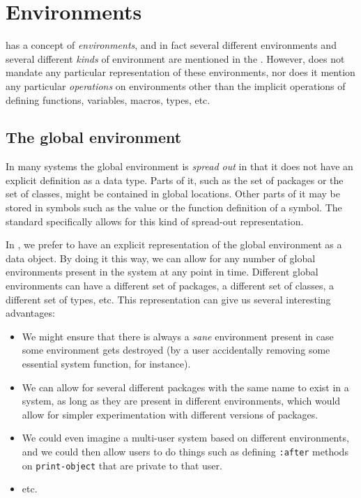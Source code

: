 \chapter{Environments}
\label{chap-environments}

\commonlisp{} has a concept of \emph{environments}, and in fact several
different environments and several different \emph{kinds} of
environment are mentioned in the \hs{}.  However, \commonlisp{} does not
mandate any particular representation of these environments, nor does
it mention any particular \emph{operations} on environments other than
the implicit operations of defining functions, variables, macros,
types, etc. 

\section{The global environment}
\label{sec-the-global-environment}

In many \commonlisp{} systems the global environment is \emph{spread
  out} in that it does not have an explicit definition as a data type.
Parts of it, such as the set of packages or the set of classes, might
be contained in global locations.  Other parts of it may be stored in
symbols such as the value or the function definition of a symbol.  The
standard specifically allows for this kind of spread-out
representation.

In \sysname{}, we prefer to have an explicit representation of the
global environment as a data object.  By doing it this way, we can
allow for any number of global environments present in the system at
any point in time.  Different global environments can have a different
set of packages, a different set of classes, a different set of types,
etc.  This representation can give us several interesting advantages: 

\begin{itemize}
\item We might ensure that there is always a \emph{sane} environment
  present in case some environment gets destroyed (by a user
  accidentally removing some essential system function, for instance).
\item We can allow for several different packages with the same name
  to exist in a system, as long as they are present in different
  environments, which would allow for simpler experimentation with
  different versions of packages. 
\item We could even imagine a multi-user system based on different
  environments, and we could then allow users to do things such as
  defining \texttt{:after} methods on \texttt{print-object} that are
  private to that user. 
\item etc.
\end{itemize}

